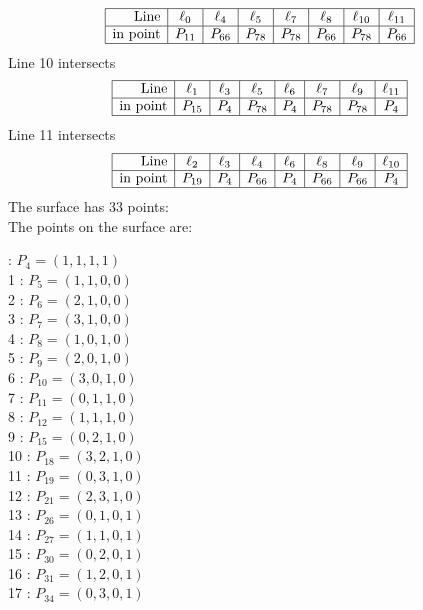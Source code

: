 \documentclass{article}
\begin{document}
{$$\begin{array}{|r*{7}{|c}|}
\hline
\mbox{Line}  & \ell_{0} & \ell_{4} & \ell_{5} & \ell_{7} & \ell_{8} & \ell_{10} & \ell_{11}\\
\hline
\mbox{in point}  & P_{11} & P_{66} & P_{78} & P_{78} & P_{66} & P_{78} & P_{66}\\
\hline
\end{array}
$$
Line 10 intersects 
$$
\begin{array}{|r*{7}{|c}|}
\hline
\mbox{Line}  & \ell_{1} & \ell_{3} & \ell_{5} & \ell_{6} & \ell_{7} & \ell_{9} & \ell_{11}\\
\hline
\mbox{in point}  & P_{15} & P_{4} & P_{78} & P_{4} & P_{78} & P_{78} & P_{4}\\
\hline
\end{array}
$$
Line 11 intersects 
$$
\begin{array}{|r*{7}{|c}|}
\hline
\mbox{Line}  & \ell_{2} & \ell_{3} & \ell_{4} & \ell_{6} & \ell_{8} & \ell_{9} & \ell_{10}\\
\hline
\mbox{in point}  & P_{19} & P_{4} & P_{66} & P_{4} & P_{66} & P_{66} & P_{4}\\
\hline
\end{array}
$$
The surface has 33 points:\\
The points on the surface are:\\
\begin{multicols}{3}
 : $P_{4}=( 1, 1, 1, 1 )$\\
1 : $P_{5}=( 1, 1, 0, 0 )$\\
2 : $P_{6}=( 2, 1, 0, 0 )$\\
3 : $P_{7}=( 3, 1, 0, 0 )$\\
4 : $P_{8}=( 1, 0, 1, 0 )$\\
5 : $P_{9}=( 2, 0, 1, 0 )$\\
6 : $P_{10}=( 3, 0, 1, 0 )$\\
7 : $P_{11}=( 0, 1, 1, 0 )$\\
8 : $P_{12}=( 1, 1, 1, 0 )$\\
9 : $P_{15}=( 0, 2, 1, 0 )$\\
10 : $P_{18}=( 3, 2, 1, 0 )$\\
11 : $P_{19}=( 0, 3, 1, 0 )$\\
12 : $P_{21}=( 2, 3, 1, 0 )$\\
13 : $P_{26}=( 0, 1, 0, 1 )$\\
14 : $P_{27}=( 1, 1, 0, 1 )$\\
15 : $P_{30}=( 0, 2, 0, 1 )$\\
16 : $P_{31}=( 1, 2, 0, 1 )$\\
17 : $P_{34}=( 0, 3, 0, 1 )$\\

\end{multicols}}
\end{document}
